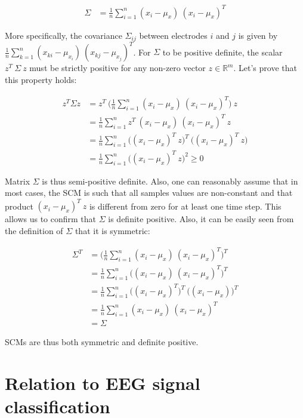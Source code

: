 \documentclass[a4paper,11pt]{report}
\begin{document}
\begin{align}
  \Sigma & = \frac{1}{n} \sum\limits_{i=1}^{n} (x_i - \mu_x) \ (x_i - \mu_x)^T
\end{align}

\noindent More specifically, the covariance $\Sigma_{ij}$ between electrodes $i$ and $j$
is given by $\frac{1}{n} \sum\limits_{k=1}^{n} (x_{ki} - \mu_{x_i}) \ (x_{kj} - \mu_{x_j})^T$.
For $\Sigma$ to be positive definite, the scalar $z^T \ \Sigma \ z$ must be strictly positive
for any non-zero vector $z \in \mathbb{R}^m$. Let's prove that this property holds:

\begin{align}
  z^T \Sigma z & = z^T \ \Big( \frac{1}{n} \sum\limits_{i=1}^{n} (x_i - \mu_x) \ (x_i - \mu_x)^T \Big) \ z \\
  & = \frac{1}{n} \sum\limits_{i=1}^{n} z^T \ (x_i - \mu_x) \ (x_i - \mu_x)^T \ z \\
  & = \frac{1}{n} \sum\limits_{i=1}^{n} \Big( (x_i - \mu_x)^T \ z \Big)^T \ \Big( (x_i - \mu_x)^T \ z \Big) \\
  & = \frac{1}{n} \sum\limits_{i=1}^{n} \Big( (x_i - \mu_x)^T \ z \Big)^2 \ge 0
\end{align}

Matrix $\Sigma$ is thus semi-positive definite. Also, one can reasonably assume that in most cases,
the SCM is such that all samples values are non-constant and that product $(x_i - \mu_x)^T \ z$
is different from zero for at least one time step. This allows us to confirm that $\Sigma$ is definite
positive. Also, it can be easily seen from the definition of $\Sigma$ that it is symmetric:

\begin{align}
  \Sigma^T & = \Big( \frac{1}{n} \sum\limits_{i=1}^{n} (x_i - \mu_x) \ (x_i - \mu_x)^T \Big)^T \\
  & = \frac{1}{n} \sum\limits_{i=1}^{n} \Big( (x_i - \mu_x) \ (x_i - \mu_x)^T \Big)^T \\
  & = \frac{1}{n} \sum\limits_{i=1}^{n} \Big( (x_i - \mu_x)^T \Big)^T \ \Big( (x_i - \mu_x) \Big)^T \\
  & = \frac{1}{n} \sum\limits_{i=1}^{n} (x_i - \mu_x) \ (x_i - \mu_x)^T \\
  & = \Sigma
\end{align}

\noindent SCMs are thus both symmetric and definite positive.

\section{Relation to EEG signal classification}
\end{document}
